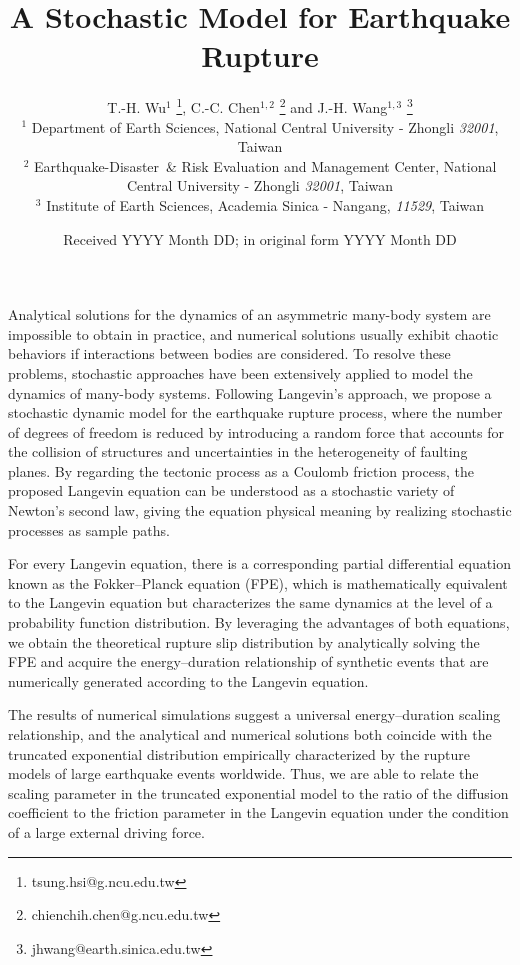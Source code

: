 \documentclass[extra]{gji} %
\title[Geophys.\ J.\ Int.: A Stochastic Model for Earthquake Rupture]
  {A Stochastic Model for Earthquake Rupture}
\author[T.-H. Wu et al.]
  {T.-H. Wu$^1$ \thanks{tsung.hsi@g.ncu.edu.tw},
    C.-C. Chen$^{1,2}$ \thanks{chienchih.chen@g.ncu.edu.tw} and
    J.-H. Wang$^{1,3}$ \thanks{jhwang@earth.sinica.edu.tw}\\
  $^1$ Department of Earth Sciences, National Central University -  Zhongli  \emph{32001}, Taiwan\\
  $^2$ Earthquake-Disaster\ \& Risk Evaluation and Management Center, National Central University - Zhongli \emph{32001}, Taiwan \\
  $^3$  Institute of Earth Sciences, Academia Sinica - Nangang, \emph{11529}, Taiwan
  }
\date{Received YYYY Month DD; in original form YYYY Month DD}
\begin{document}
\label{firstpage}

\maketitle
\linenumbers %

\begin{summary}
    Analytical solutions for the dynamics of an asymmetric many-body system are impossible to obtain in practice, and numerical solutions usually exhibit chaotic behaviors if interactions between bodies are considered.
    To resolve these problems, stochastic approaches have been extensively applied to model the dynamics of many-body systems.
    Following Langevin's approach, we propose a stochastic dynamic model for the earthquake rupture process, where the number of degrees of freedom is reduced by introducing a random force that accounts for the collision of structures and uncertainties in the heterogeneity of faulting planes.
    By regarding the tectonic process as a Coulomb friction process, the proposed Langevin equation can be understood as a stochastic variety of Newton's second law, giving the equation physical meaning by realizing stochastic processes as sample paths.
    
    For every Langevin equation, there is a corresponding partial differential equation known as the Fokker--Planck equation (FPE), which
    is mathematically equivalent to the Langevin equation but characterizes the same dynamics at the level of a probability function distribution.
    By leveraging the advantages of both equations, we obtain the theoretical rupture slip distribution by analytically solving the FPE and acquire the energy--duration relationship of synthetic events that are numerically generated according to the Langevin equation.
    
    The results of numerical simulations suggest a universal energy--duration scaling relationship, and
    the analytical and numerical solutions both coincide with the truncated exponential distribution empirically characterized by the rupture models of large earthquake events worldwide.
    Thus,
    we are able to relate the scaling parameter in the truncated exponential model to the ratio of the diffusion coefficient to the friction parameter in the Langevin equation under the condition of a large external driving force.
    
\end{summary}
\end{document}
